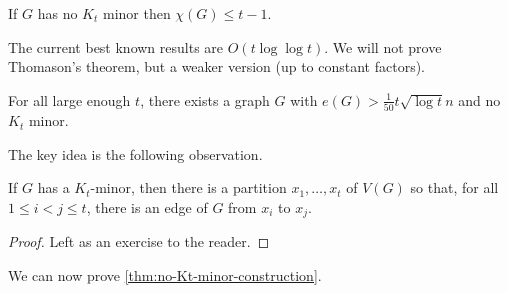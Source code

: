 \documentclass[main.tex]{subfiles}
\begin{document}
\begin{conjecture}
  If $G$ has no $K_t$ minor then $\chi(G)\leq t-1$.
\end{conjecture}
The current best known results are $O(t\log\log t)$.
We will not prove Thomason's theorem, but a weaker version (up to constant factors).
\begin{theorem}
  \th\label{thm:no-Kt-minor-construction}
  For all large enough $t$, there exists a graph $G$ with
  $e(G) > \frac{1}{50} t\sqrt{\log t}n$ and no $K_t$ minor.
\end{theorem}
The key idea is the following observation.
\begin{observation*}
  If $G$ has a $K_t$-minor, then there is a partition $x_1,\ldots,x_t$ of $V(G)$
  so that, for all $1\leq i < j\leq t$, there is an edge of $G$ from $x_i$ to $x_j$.
\end{observation*}
\begin{proof}
  Left as an exercise to the reader.
\end{proof}
We can now prove \th\ref{thm:no-Kt-minor-construction}.
\end{document}
